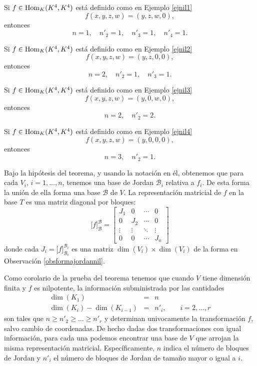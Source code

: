 \begin{ejem}
Si $f\in\operatorname{Hom}_K(K^4,K^4)$ est\'a definido como en Ejemplo \ref{ejnil1}
$$f(x,y,z,w)=(y,z,w,0),$$
entonces
$$n=1,\quad n'_2=1,\quad n'_3=1,\quad n'_4=1.$$
\end{ejem}

\begin{ejem}
Si $f\in\operatorname{Hom}_K(K^4,K^4)$ est\'a definido como en Ejemplo \ref{ejnil2}
$$f(x,y,z,w)=(y,z,0,0),$$
entonces
$$n=2,\quad n'_2=1,\quad n'_3=1.$$
\end{ejem}

\begin{ejem}
Si $f\in\operatorname{Hom}_K(K^4,K^4)$ est\'a definido como en Ejemplo \ref{ejnil3}
$$f(x,y,z,w)=(y,0,w,0),$$
entonces
$$n=2,\quad n'_2=2.$$
\end{ejem}

\begin{ejem}
Si $f\in\operatorname{Hom}_K(K^4,K^4)$ est\'a definido como en Ejemplo \ref{ejnil4}
$$f(x,y,z,w)=(y,0,0,0),$$
entonces
$$n=3,\quad n'_2=1.$$
\end{ejem}

\begin{obs}\label{bloquesjordannil}
Bajo la hip\'otesis del teorema, y usando la notaci\'on en \'el, obtenemos que para cada $V_i$, $i=1,\ldots,n$, tenemos una base de Jordan $\mathcal{B}_i$ relativa a $f_i$. De esta forma la uni\'on de ella forma una base $\mathcal{B}$ de $V$. La representaci\'on matricial de $f$ en la base $T$ es una matriz diagonal por bloques:
\[
\Big[f\Big]^\mathcal{B}_\mathcal{B}=\left[\begin{array}{c|c|c|c}
J_1 & 0 & \cdots & 0\\
\hline
0 & J_2 & \cdots & 0\\
\hline
\vdots & \vdots & \ddots & \vdots\\
\hline
0 & 0 & \cdots & J_n
\end{array}\right] 
\]
donde cada $J_i=\Big[f\Big]^{\mathcal{B}_i}_{\mathcal{B}_i}$ es una matriz $\dim(V_i)\times\dim(V_i)$ de la forma en Observaci\'on \ref{obsformajordannil}.
\end{obs}

\begin{obs}
Como corolario de la prueba del teorema tenemos que cuando $V$ tiene dimensi\'on finita y $f$ es nilpotente, la informaci\'on subministrada por las cantidades 
\begin{eqnarray*}
\dim(K_1) & = & n\\
\dim(K_i)-\dim(K_{i-1}) & = & n'_i,\qquad i=2,\ldots,r
\end{eqnarray*}
son tales que  $n\ge n'_2\ge \ldots \ge n'_r$ y determinan univocamente la transformaci\'on $f$, salvo cambio de coordenadas. De hecho dadas dos transformaciones con igual informaci\'on, para cada una podemos encontrar una base de $V$ que arrojan la misma representaci\'on matricial. Espec\'ificamente, $n$ indica el n\'umero de bloques de Jordan y $n'_i$ el n\'umero de bloques de Jordan de tama\~no mayor o igual a $i$.
\end{obs}

